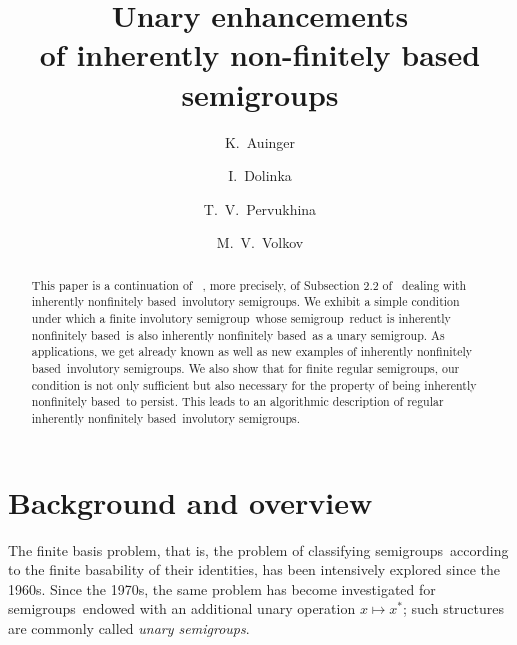 \documentclass[11pt,reqno]{amsart}
\newcommand{\sgp}{semi\-group}
\newcommand{\sgps}{semi\-groups}
\newcommand{\is}{involutory semi\-group}
\newcommand{\iss}{involutory semi\-groups}
\newcommand{\fbp}{finite basis problem}
\newcommand{\infb}{inherently non\-finitely based}
\begin{document}
\title{Unary enhancements\\ of inherently non-finitely based semigroups}
\author{K.~Auinger}
\address{Fakult\"at f\"ur Mathematik, Universit\"at Wien, Nordbergstrasse 15,  A-1090 Wien, Austria}

\author{I.~Dolinka}
\address{ Department of Mathematics and Informatics, University of Novi Sad, Trg Do\-si\-teja Obradovi\'ca 4, 21101 Novi Sad, Serbia}

\author{T.~V.~Pervukhina}
\address{Institute of Mathematics and Computer Science, Ural Federal University, Lenina 51, 620000 Ekaterinburg, Russia}

\author{M.~V.~Volkov}

\maketitle

\begin{abstract}
This paper is a continuation of ~\cite{ADV:2012}, more precisely, of Subsection 2.2 of~\cite{ADV:2012} dealing with \infb\ \iss. We exhibit
a simple condition under which a finite \is\ whose \sgp\ reduct is \infb\ is also \infb\ as a unary \sgp. As applications, we get already
known as well as new examples of \infb\ \iss. We also show that for finite regular semigroups, our condition is not only sufficient but
also necessary for the property of being \infb\ to persist. This leads to an algorithmic description of regular \infb\ \iss.
\end{abstract}

\section{Background and overview}

The \fbp, that is, the problem of classifying \sgps\ according to the finite basability of their identities, has been intensively explored
since the 1960s. Since the 1970s, the same problem has become investigated for \sgps\ endowed with an additional unary operation $x\mapsto
x^*$; such structures are commonly called \emph{unary \sgps}.
\end{document}
